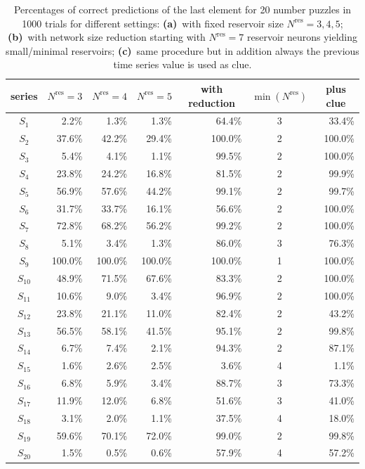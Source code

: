 \documentclass{sn-jnl}
\theoremstyle{definition}
\newcommand{\head}[1]{\multicolumn{1}{c}{#1}}
\begin{document}
\begin{table}[h]
  \centering
  \begin{tabular}{crrrrcr}
	\toprule
 	\head{series} & \head{$N^\mathrm{res}=3$}& \head{$N^\mathrm{res}=4$} & \head{$N^\mathrm{res}=5$} & \head{with reduction} &  \head{$\min(N^\mathrm{res})$} & \head{plus clue}\\ \midrule
	$S_{1}$ & 2.2\% & 1.3\% & 1.3\% & 64.4\% & 3 & 33.4\% \\
	$S_{2}$ & 37.6\% & 42.2\% & 29.4\% & 100.0\% & 2 & 100.0\% \\
	$S_{3}$ & 5.4\% & 4.1\% & 1.1\% & 99.5\% & 2 & 100.0\% \\
	$S_{4}$ & 23.8\% & 24.2\% & 16.8\% & 81.5\% & 2 & 99.9\% \\
	$S_{5}$ & 56.9\% & 57.6\% & 44.2\% & 99.1\% & 2 & 99.7\% \\
	$S_{6}$ & 31.7\% & 33.7\% & 16.1\% & 56.6\% & 2 & 100.0\% \\
	$S_{7}$ & 72.8\% & 68.2\% & 56.2\% & 99.2\% & 2 & 100.0\% \\
	$S_{8}$ & 5.1\% & 3.4\% & 1.3\% & 86.0\% & 3 & 76.3\% \\
	$S_{9}$ & 100.0\% & 100.0\% & 100.0\% & 100.0\% & 1 & 100.0\% \\
	$S_{10}$ & 48.9\% & 71.5\% & 67.6\% & 83.3\% & 2 & 100.0\% \\
	$S_{11}$ & 10.6\% & 9.0\% & 3.4\% & 96.9\% & 2 & 100.0\% \\
	$S_{12}$ & 23.8\% & 21.1\% & 11.0\% & 82.4\% & 2 & 43.2\% \\
	$S_{13}$ & 56.5\% & 58.1\% & 41.5\% & 95.1\% & 2 & 99.8\% \\
	$S_{14}$ & 6.7\% & 7.4\% & 2.1\% & 94.3\% & 2 & 87.1\% \\
	$S_{15}$ & 1.6\% & 2.6\% & 2.5\% & 3.6\% & 4 & 1.1\% \\
	$S_{16}$ & 6.8\% & 5.9\% & 3.4\% & 88.7\% & 3 & 73.3\% \\
	$S_{17}$ & 11.9\% & 12.0\% & 6.8\% & 51.6\% & 3 & 41.0\% \\
	$S_{18}$ & 3.1\% & 2.0\% & 1.1\% & 37.5\% & 4 & 18.0\% \\
	$S_{19}$ & 59.6\% & 70.1\% & 72.0\% & 99.0\% & 2 & 99.8\% \\
	$S_{20}$ & 1.5\% & 0.5\% & 0.6\% & 57.9\% & 4 & 57.2\% \\ \bottomrule
  \end{tabular}
  \caption{Percentages of correct predictions of the last element for 20 number
	puzzles \citep{RK11,GW13} in 1000 trials for different settings:
	\textbf{(a)}~with fixed reservoir size $N^\mathrm{res}=3,4,5$;
	\textbf{(b)}~with network size reduction starting with
	$N^\mathrm{res}=7$ reservoir neurons yielding small/minimal reservoirs;
	\textbf{(c)}~same procedure but in addition always the previous time
	series value is used as clue.}
  \label{table}
\end{table}
\end{document}

